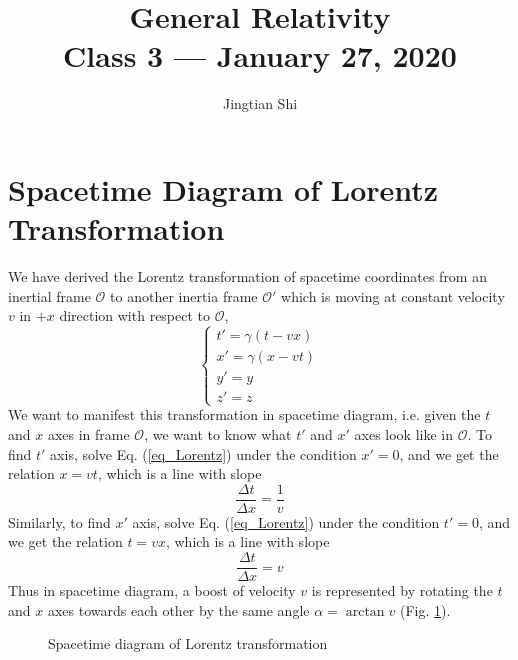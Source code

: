 \documentclass[11pt]{article}
\title{{\Huge General Relativity}\\{\Large{Class 3 --- January 27, 2020}}} %
\author{Jingtian Shi}
\begin{document}
\maketitle
\flushbottom
\newpage
\pagestyle{fancynotes}

\section{Spacetime Diagram of Lorentz Transformation}

We have derived the Lorentz transformation of spacetime coordinates from an inertial frame $\mathcal{O}$ to another inertia frame $\mathcal{O}'$ which is moving at constant velocity $v$ in $+x$ direction with respect to $\mathcal{O}$,
\begin{equation}
    \begin{cases}
        t'=\gamma(t-vx) \\
        x'=\gamma(x-vt) \\
        y'=y \\
        z'=z
    \end{cases}
    \label{eq_Lorentz}
\end{equation}
We want to manifest this transformation in spacetime diagram, i.e. given the $t$ and $x$ axes in frame $\mathcal{O}$, we want to know what $t'$ and $x'$ axes look like in $\mathcal{O}$. To find $t'$ axis, solve Eq. (\ref{eq_Lorentz}) under the condition $x'=0$, and we get the relation $x=vt$, which is a line with slope
\begin{equation}
    \frac{\Delta t}{\Delta x}=\frac{1}{v}
\end{equation}
Similarly, to find $x'$ axis, solve Eq. (\ref{eq_Lorentz}) under the condition $t'=0$, and we get the relation $t=vx$, which is a line with slope
\begin{equation}
    \frac{\Delta t}{\Delta x}=v
\end{equation}
Thus in spacetime diagram, a boost of velocity $v$ is represented by rotating the $t$ and $x$ axes towards each other by the same angle $\alpha=\arctan v$ (Fig. \ref{fig_sptdiagram}).

\begin{figure}[H]
    \centering
    \caption{Spacetime diagram of Lorentz transformation}
    \label{fig_sptdiagram}
\end{figure}
\end{document}
